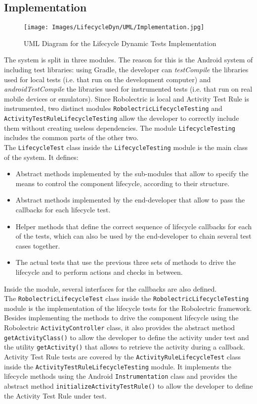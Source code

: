 \documentclass[11pt,a4paper,notitlepage]{article}
\begin{document}
\subsection{Implementation}
\begin{figure}
  \centering
  \texttt{[image: Images/LifecycleDyn/UML/Implementation.jpg]}
  \caption[Lifecycle Tests Implementation UML]{UML Diagram for the Lifecycle Dynamic Tests Implementation}
\end{figure}
The system is split in three modules. The reason for this is the Android system of including test libraries: using Gradle, the developer can \textit{testCompile} the libraries used for local tests (i.e. that run on the development computer) and \textit{androidTestCompile} the libraries used for instrumented tests (i.e. that run on real mobile devices or emulators). Since Robolectric is local and Activity Test Rule is instrumented, two distinct modules \texttt{RobolectricLifecycleTesting} and \texttt{ActivityTestRuleLifecycleTesting} allow the developer to correctly include them without creating useless dependencies. The module \texttt{LifecycleTesting} includes the common parts of the other two.\medskip \\
The \texttt{LifecycleTest} class inside the \texttt{LifecycleTesting} module is the main class of the system. It defines:
\begin{itemize}
	\item Abstract methods implemented by the sub-modules that allow to specify the means to control the component lifecycle, according to their structure.
	\item Abstract methods implemented by the end-developer that allow to pass the callbacks for each lifecycle test.
	\item Helper methods that define the correct sequence of lifecycle callbacks for each of the tests, which can also be used by the end-developer to chain several test cases together.
	\item The actual tests that use the previous three sets of methods to drive the lifecycle and to perform actions and checks in between.
\end{itemize}
Inside the module, several interfaces for the callbacks are also defined. \bigskip \\
The \texttt{RobolectricLifecycleTest} class inside the  \texttt{RobolectricLifecycleTesting} module is the implementation of the lifecycle tests for the Robolectric framework. Besides implementing the methods to drive the component lifecycle using the Robolectric \texttt{ActivityController} class, it also provides the abstract method \texttt{getActivityClass()} to allow the developer to define the activity under test and the utility \texttt{getActivity()} that allows to retrieve the activity during a callback.\bigskip \\
Activity Test Rule tests are covered by the \texttt{ActivityRuleLifecycleTest} class inside the \texttt{ActivityTestRuleLifecycleTesting} module. It implements the lifecycle methods using the Android \texttt{Instrumentation} class and provides the abstract method \texttt{initializeActivityTestRule()} to allow the developer to define the Activity Test Rule under test.
\end{document}
